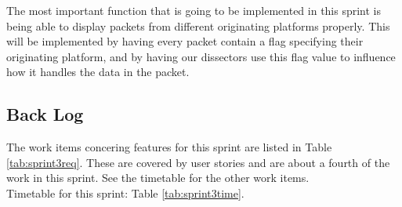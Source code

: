 The most important function that is going to be implemented in this sprint is being able to display \glspl{packet} from different originating platforms properly. This will be implemented by having every \gls{packet} contain a flag specifying their originating platform, and by having our \glspl{dissector} use this flag value to influence how it handles the data in the \gls{packet}.

\subsection{Back Log}
The work items concering features for this sprint are listed in Table \ref{tab:sprint3req}. These are covered by user stories and are about a fourth of the work in this sprint. See the timetable for the other work items.\\
Timetable for this sprint: Table \ref{tab:sprint3time}. \\

